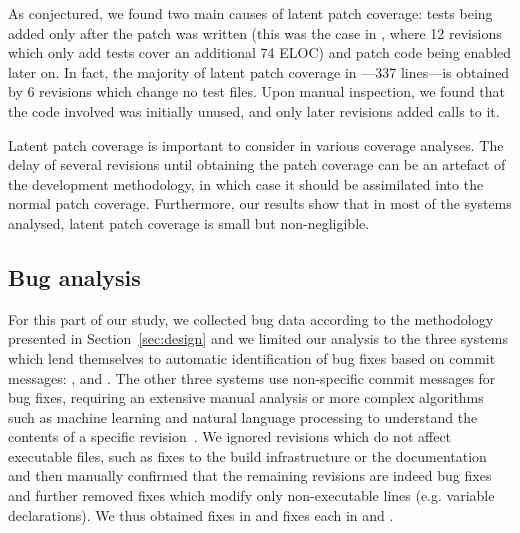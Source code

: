 As conjectured, we found two main causes of latent patch coverage:
tests being added only after the patch was written (this was the case
in \lighttpdtwo, where 12 revisions which only add tests cover an
additional 74 ELOC) and patch code being enabled later on. In fact,
the majority of latent patch coverage in \lighttpdtwo---337 lines---is
obtained by 6 revisions which change no test files.  Upon manual
inspection, we found that the code involved was initially unused, and
only later revisions added calls to it.

Latent patch coverage is important to consider in various coverage
analyses. The delay of several revisions until obtaining the patch
coverage can be an artefact of the development methodology, in which
case it should be assimilated into the normal patch coverage. Furthermore,
our results show that in most of the systems analysed, latent patch
coverage is small but non-negligible.

\subsection{Bug analysis}
\label{sec:bugs}


For this part of our study, we collected bug data according to the
methodology presented in Section~\ref{sec:design} and we limited our
analysis to the three systems which lend themselves to automatic
identification of bug fixes based on commit messages:
\memcached, \redis and \zeromq.  The other three systems
use non-specific commit messages for bug fixes, requiring an extensive
manual analysis or more complex algorithms such as machine learning
and natural language processing to understand the contents of a
specific revision~\cite{categorization:esem10}.  We ignored revisions
which do not affect executable files, such as fixes to the build
infrastructure or the documentation and then manually confirmed
that the remaining revisions are indeed bug
fixes~\cite{bug-feature:icse13} and further removed fixes which modify
only non-executable lines (e.g. variable declarations). We thus
obtained \memcachedFixes fixes in \memcached and \redisFixes fixes each in \redis
and \zeromq. %

